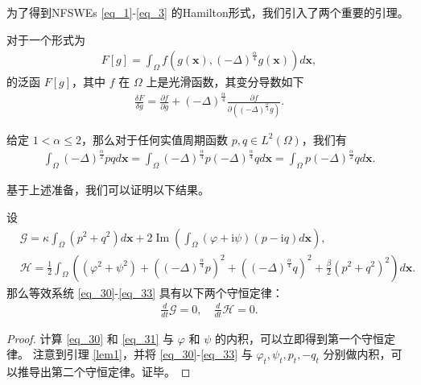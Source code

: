 为了得到NFSWEs \eqref{eq_1}-\eqref{eq_3} 的Hamilton形式，我们引入了两个重要的引理。

\begin{lemma}\label{lem2}
 对于一个形式为
\begin{align}\label{eq_25}
F[g]=\int_{\Omega} f\left(g(\boldsymbol{x}),(-\Delta)^{\frac{\alpha}{4}} g(\boldsymbol{x})\right) d \boldsymbol{x},
\end{align}
的泛函 $F[g]$，其中 $f$ 在 $\Omega$ 上是光滑函数，其变分导数如下
\begin{align}\label{eq_26}
\frac{\delta F}{\delta g}=\frac{\partial f}{\partial g}+(-\Delta)^{\frac{\alpha}{4}} \frac{\partial f}{\partial\left((-\Delta)^{\frac{\alpha}{4}} g\right)} .
\end{align}
\end{lemma}

\begin{lemma}\label{lem1}
 给定 $1<\alpha \leq 2$，那么对于任何实值周期函数 $p, q \in L^{2}(\Omega)$，我们有
\begin{align}\label{eq_22}
\int_{\Omega}(-\Delta)^{\frac{\alpha}{2}} p q d \boldsymbol{x}=\int_{\Omega}(-\Delta)^{\frac{\alpha}{4}} p(-\Delta)^{\frac{\alpha}{4}} q d \boldsymbol{x}=\int_{\Omega} p(-\Delta)^{\frac{\alpha}{2}} q d \boldsymbol{x}.
\end{align}
\end{lemma}

基于上述准备，我们可以证明以下结果。

\begin{theorem}	\label{thm2_1}
设
\begin{align}
&\mathcal{G}=\kappa\int_{\Omega}(p^2+q^2) d \boldsymbol{x}+2\operatorname{Im}(\int_{\Omega}(\varphi+\mathrm{i}\psi)(p-\mathrm{i}q)d \boldsymbol{x}),\label{eq_34} \\
&\mathcal{H}=\frac{1}{2}\int_{\Omega}\left((\varphi^2+\psi^2)+\left((-\Delta)^{\frac{\alpha}{4}} p\right)^{2}+\left((-\Delta)^{\frac{\alpha}{4}} q\right)^{2}+\frac{\beta}{2}(p^2+q^2)^{2}\right) d \boldsymbol{x}.\label{eq_35}
\end{align}
那么等效系统 \eqref{eq_30}-\eqref{eq_33} 具有以下两个守恒定律：
\begin{align}
\frac{d}{d t} \mathcal{G}=0, \quad \frac{d}{d t} \mathcal{H}=0.
\end{align}
\end{theorem}

\begin{proof}
计算 \eqref{eq_30} 和 \eqref{eq_31} 与 $\varphi$ 和 $\psi$ 的内积，可以立即得到第一个守恒定律。
注意到引理 \ref{lem1}，并将 \eqref{eq_30}-\eqref{eq_33} 与 $\varphi_{t}, \psi_{t}, p_{t},-q_{t}$ 分别做内积，可以推导出第二个守恒定律。证毕。
\end{proof}

